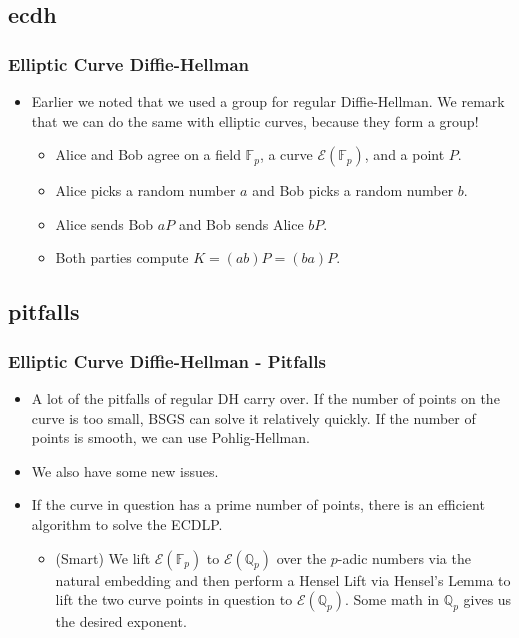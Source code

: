 \documentclass[aspectratio=169,t]{beamer}
\newcommand{\QQ}{\mathbb{Q}}
\newcommand{\FF}{\mathbb{F}}
\begin{document}
\subsection{ecdh}
\begin{frame}
\frametitle{Elliptic Curve Diffie-Hellman}
\begin{itemize}
\item
Earlier we noted that we used a group for regular Diffie-Hellman. We remark that
we can do the same with elliptic curves, because they form a group!
\begin{itemize}
\item
Alice and Bob agree on a field $\FF_p$, a curve $\mathcal{E}(\FF_p)$, and a
point $P$.
\item
Alice picks a random number $a$ and Bob picks a random number $b$.
\item
Alice sends Bob $aP$ and Bob sends Alice $bP$.
\item
Both parties compute $K = (ab)P = (ba)P$.
\end{itemize}
\end{itemize}
\end{frame}

\subsection{pitfalls}
\begin{frame}
\frametitle{Elliptic Curve Diffie-Hellman - Pitfalls}
\begin{itemize}
\item
A lot of the pitfalls of regular DH carry over. If the number of points on the
curve is too small, BSGS can solve it relatively quickly. If the number of
points is smooth, we can use Pohlig-Hellman. \pause
\item
We also have some new issues.
\item
If the curve in question has a prime number of points, there is an efficient
algorithm to solve the ECDLP. \pause
\begin{itemize}
\item
(Smart) We lift $\mathcal{E}(\FF_p)$ to $\mathcal{E}(\QQ_p)$ over the $p$-adic
numbers via the natural embedding and then perform a Hensel Lift via Hensel's
Lemma to lift the two curve points in question to $\mathcal{E}(\QQ_p)$. Some
math in $\QQ_p$ gives us the desired exponent.
\end{itemize}
\end{itemize}
\end{frame}
\end{document}
